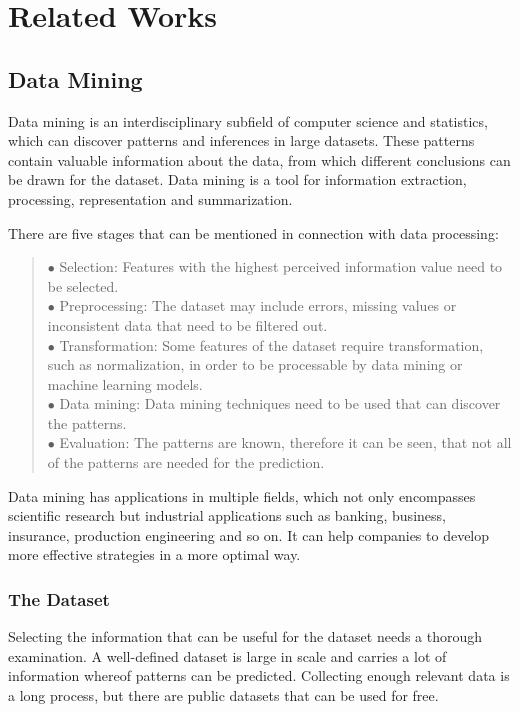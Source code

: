 \chapter{Related Works}

\section{Data Mining}

Data mining \cite{zaki2010advances, han2011data} is an interdisciplinary subfield of computer science and statistics, which can discover patterns and inferences in large datasets. These patterns contain valuable information about the data, from which different conclusions can be drawn for the dataset. Data mining is a tool for information extraction, processing, representation and summarization. 

\medskip \noindent There are five stages that can be mentioned in connection with data processing:
\begin{verse}
	$\bullet$ Selection: Features with the highest perceived information value need to be selected.\\
	$\bullet$ Preprocessing: The dataset may include errors, missing values or inconsistent data that need to be filtered out.\\
	$\bullet$ Transformation: Some features of the dataset require transformation, such as normalization, in order to be processable by data mining or machine learning models.\\
	$\bullet$ Data mining: Data mining techniques need to be used that can discover the patterns.\\
	$\bullet$ Evaluation: The patterns are known, therefore it can be seen, that not all of the patterns are needed for the prediction.
\end{verse}

Data mining has applications in multiple fields, which not only encompasses scientific research but industrial applications such as banking, business, insurance, production engineering and so on. It can help companies to develop more effective strategies in a more optimal way.



\subsection{The Dataset}

Selecting the information that can be useful for the dataset needs a thorough examination. A well-defined dataset is large in scale and carries a lot of information whereof patterns can be predicted. Collecting enough relevant data is a long process, but there are public datasets that can be used for free. \medskip

